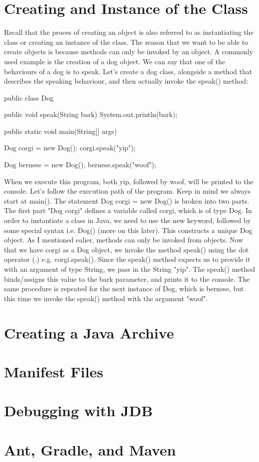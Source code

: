 \documentclass{article}
\begin{document}
\section{Creating and Instance of the Class}

Recall that the proces of creating an object is also referred to as instantiating the class or creating an
instance of the class. The reason that we want to be able to create objects is because methods can only be
invoked by an object. A commonly used example is the creation of a dog object. We can say that one of the
behaviours of a dog is to speak. Let’s create a dog class, alongside a method that describes the speaking
behaviour, and then actually invoke the speak() method:

\begin{jlst}
public class Dog {
    public void speak(String bark) {
        System.out.println(bark);
    }

    public static void main(String[] args) {
        Dog corgi = new Dog();
        corgi.speak("yip");

        Dog bernese = new Dog();
        bernese.speak("woof");
    }
}
\end{jlst}

When we execute this program, both yip, followed by woof, will be printed to the console. Let’s follow the
execution path of the program. Keep in mind we always start at main(). The statement Dog corgi = new Dog() is
broken into two parts. The first part "Dog corgi" defines a variable called corgi, which is of type Dog. In
order to instantiate a class in Java, we need to use the new keyword, followed by some special syntax i.e.
Dog() (more on this later). This constructs a unique Dog object. As I mentioned ealier, methods can only be
invoked from objects. Now that we have corgi as a Dog object, we invoke the method speak() using the dot
operator (.) e.g. corgi.speak(). Since the speak() method expects us to provide it with an argument of type
String, we pass in the String "yip". The speak() method binds/assigns this value to the bark parameter, and
prints it to the console. The same procedure is repeated for the next instance of Dog, which is bernese, but
this time we invoke the speak() method with the argument "woof".

\section{Creating a Java Archive}

\section{Manifest Files}

\section{Debugging with JDB}

\section{Ant, Gradle, and Maven}
\end{document}
